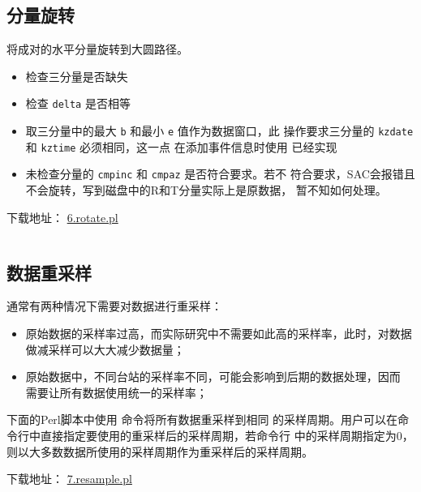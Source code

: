 \subsection{分量旋转}
\label{subsec:rotate-perl}
将成对的水平分量旋转到大圆路径。
\begin{itemize}
\item 检查三分量是否缺失
\item 检查 \texttt{delta} 是否相等
\item 取三分量中的最大 \texttt{b} 和最小 \texttt{e} 值作为数据窗口，此
    操作要求三分量的 \texttt{kzdate} 和 \texttt{kztime} 必须相同，这一点
    在添加事件信息时使用  已经实现
\item 未检查分量的 \texttt{cmpinc} 和 \texttt{cmpaz} 是否符合要求。若不
    符合要求，SAC会报错且不会旋转，写到磁盘中的R和T分量实际上是原数据，
    暂不知如何处理。
\end{itemize}

下载地址： \href{https://raw.githubusercontent.com/seisman/SAC_Docs_zh/master/call-in-script/6.rotate.pl}{6.rotate.pl}
\inputminted{perl}{./call-in-script/6.rotate.pl}

\subsection{数据重采样}
\label{subsec:resample-perl}
通常有两种情况下需要对数据进行重采样：
\begin{itemize}
\item 原始数据的采样率过高，而实际研究中不需要如此高的采样率，此时，对数据
    做减采样可以大大减少数据量；
\item 原始数据中，不同台站的采样率不同，可能会影响到后期的数据处理，因而
    需要让所有数据使用统一的采样率；
\end{itemize}
下面的Perl脚本中使用  命令将所有数据重采样到相同
的采样周期。用户可以在命令行中直接指定要使用的重采样后的采样周期，若命令行
中的采样周期指定为0，则以大多数数据所使用的采样周期作为重采样后的采样周期。

下载地址： \href{https://raw.githubusercontent.com/seisman/SAC_Docs_zh/master/call-in-script/7.resample.pl}{7.resample.pl}
\inputminted{perl}{./call-in-script/7.resample.pl}
